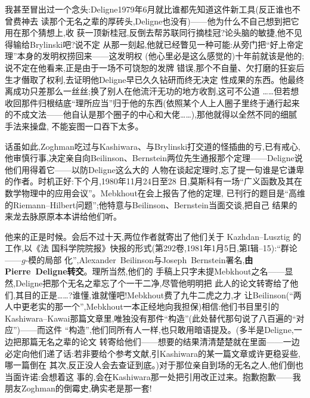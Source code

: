 我甚至冒出过一个念头:Deligne1979年6月就比谁都先知道这件新工具(反正谁也不曾费神去
读那个无名之辈的厚砖头,Deligne也没有)——他为什么不自己想到把它用在那个猜想上,收
获一顶新桂冠,反倒去帮苏联同行摘桂冠?论头脑的敏捷,他不见得输给Brylinski吧?说不定
从那一刻起,他就已经瞥见一种可能:从旁门把“好上帝定理”本身的发明权捞回来——这发明权
(他心里必是这么感觉的)十年前就该是他的;说不定在他看来,正是由于一场不可饶恕的发牌
错误,那个不自量、欠打磨的狂妄后生才僭取了权利,去证明他Deligne早已久久钻研而终无决定
性成果的东西。他最终离成功只差那么一丝丝;换了别人在他流汗无功的地方收割,这可不公道
……但若想收回那件归根结底“理所应当”归于他的东西(依照某个人上人圈子里终于通行起来
的不成文法——他自认是那个圈子的中心和大佬……),那他就得以全然不同的细腻手法来操盘,
不能妄图一口吞下太多。

话虽如此,Zoghman吃过与Kashiwara、与Brylinski打交道的怪插曲的亏,已有戒心,他审慎行事,决定亲自向Beilinson、Bernstein两位先生通报那个定理——Deligne说他们用得着它——以防Deligne这么大的
人物在谈起定理时,忘了提一句谁是它谦卑的作者。时机正好:下个月,1980年11月24日至28
日,莫斯科有一场“广义函数及其在数学物理中的应用会议”。Mebkhout在会上报告了他的定理,
已刊行的\dmark{}题目是“高维的Riemann--Hilbert问题”;他特意与Beilinson、Bernstein当面交谈,把自己
结果的来龙去脉原原本本讲给他们听。

他来的正是时候。会后不过十天,两位作者就寄出了他们关于 Kazhdan--Lusztig 的工作,以《法
国科学院院报》快报的形式(第292卷,1981年1月5日,第I辑--15):“群论——$g$-模的局部
化”,Alexander~Beilinson与Joseph~Bernstein署名,\textbf{由Pierre~Deligne转交}。理所当然,他们的
手稿上只字未提Mebkhout之名——显然,Deligne把那个无名之辈忘了个一干二净,尽管他明明把
此人的论文转寄给了他们,其目的正是……?谁懂,谁就懂吧!Mebkhout费了九牛二虎之力,才
让Beilinson(“两人中更老实的那一个”,Mebkhout一本正经地向我担保)相信:他们书目里引的
Kashiwara--Kawai那篇文章里,唯独没有那件“构造”(此处替代那句说了八百遍的“对应”)——而这件
“构造”,他们同所有人一样,也只敢用暗语提及。(多半是Deligne,一边把那篇无名之辈的论文
转寄给他们——想要的结果清清楚楚就在里面——一边必定向他们递了话:若非要给个参考文献,引Kashiwara的某一篇文章或许更稳妥些,哪一篇倒在
其次,反正没人会去查证到底。)对于那位亲自到场的无名之人,他们倒也当面许诺:会想着这
事的,会在Kashiwara那一处把引用改正过来。抱歉抱歉——我朋友Zoghman的倒霉史,确实老是那一套!

